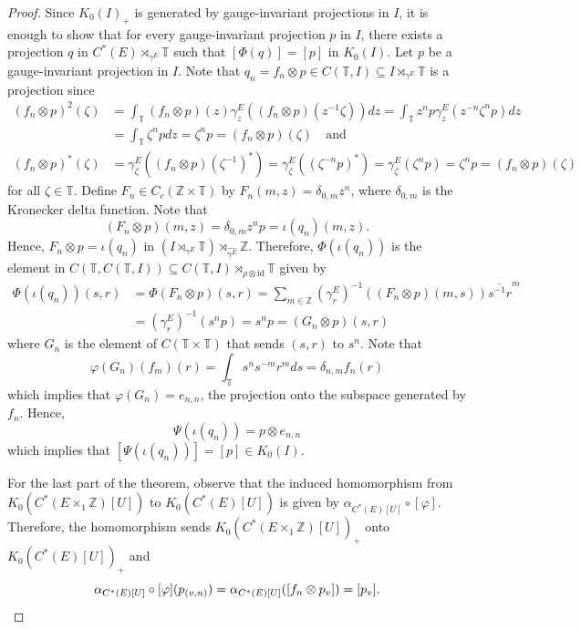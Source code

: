 \documentclass[12pt]{amsbook}%
\renewcommand{\phi}{\varphi}
\theoremstyle{defin}
\theoremstyle{remark}
\numberwithin{equation}{chapter}
\numberwithin{theor}{section}
\newcommand{\ZZ}{\mathbb{Z}}
\begin{document}
\begin{proof}
Since $K_0 (I)_+$ is generated by gauge-invariant projections in $I$, it is enough to show that for every gauge-invariant projection $p$ in $I$, there exists a projection $q$ in $C^*(E) \rtimes_{\gamma^E} \mathbb{T}$ such that $[ \Phi (q) ] = [p]$ in $K_0(I)$.  Let $p$ be a gauge-invariant projection in $I$.  Note that $q_n= f_n \otimes p \in C ( \mathbb{T} , I ) \subseteq I \rtimes_{\gamma^E} \mathbb{T}$ is a projection since
\begin{align*}
( f_n \otimes p )^2 (\zeta ) &= \int_\mathbb{T} ( f_n \otimes p )(z) \gamma_z^E ( ( f_n \otimes p)(z^{-1} \zeta) )dz = \int_\mathbb{T} z^n p \gamma_z^E ( z^{-n} \zeta^n p ) dz \\
				&= \int_\mathbb{T}  \zeta^n p dz = \zeta^n p = ( f_n \otimes p )(\zeta) \quad  \text{and} \\
(f_n \otimes p)^*(\zeta) &= \gamma_\zeta^E ( (f_n \otimes p)(\zeta^{-1})^* ) = \gamma_\zeta^E ( ( \zeta^{-n} p)^*) =\gamma_\zeta^E ( \zeta^n p)= \zeta^n p = (f_n \otimes p)(\zeta)
\end{align*}
for all $\zeta \in \mathbb{T}$.  Define $F_n \in C_c ( \ZZ \times \mathbb{T} )$ by $F_n ( m , z ) = \delta_{0, m} z^n$, where $\delta_{0,m}$ is the Kronecker delta function.  Note that 
\[
(F_n \otimes p)(m, z ) = \delta_{0,m} z^n p = \iota(q_n)(m,z).
\]
Hence, $F_n \otimes p = \iota (q_n)$ in $(I \rtimes_{\gamma^E} \mathbb{T} ) \rtimes_{ \widehat{\gamma^E}} \mathbb{Z}$.  Therefore, $\Phi ( \iota ( q_n ) )$ is the element in $C ( \mathbb{T} , C ( \mathbb{T} , I)) \subseteq C ( \mathbb{T} , I ) \rtimes_{ \rho \otimes \mathrm{id} } \mathbb{T}$ given by 
\begin{align*}
\Phi ( \iota ( q_n ) ) (s,r) &=  \Phi (F_n \otimes p )(s,r) = \sum_{ m \in \ZZ } (\gamma_{r}^E)^{-1} ( (F_n\otimes p )( m, s ) )\overline{ s^{-1} r }^m \\
				&= (\gamma_r^E)^{-1} ( s^n p  ) =  s^n p = (G_n \otimes p)(s,r )
\end{align*}
where $G_n$ is the element of $C ( \mathbb{T} \times \mathbb{T} )$ that sends $(s,r)$ to $s^n$.  Note that 
\[
\phi (G_n )(f_m)(r) = \int_\mathbb{T} s^n  s^{-m} r^m ds = \delta_{n, m} f_n (r)
\]  
which implies that $\phi( G_n) = e_{n,n}$, the projection onto the subspace generated by $f_n$.  Hence, 
\[
\Psi ( \iota ( q_{n} ) ) = p \otimes e_{n,n}
\]
which implies that $[ \Psi ( \iota (q_n) ) ] = [ p ] \in K_0 (I)$.


For the last part of the theorem, observe that the induced homomorphism from $K_0 ( C^*( E \times_1 \ZZ ) [ U ] )$ to $K_0 ( C^*(E)[U])$ is given by $\alpha_{ C^*(E)[U] } \circ [\phi]$.   Therefore, the homomorphism sends $K_0 ( C^*( E \times_1 \ZZ ) [ U ] )_+$ onto $K_0 ( C^*(E)[U])_+$ and 
\[
\alpha_{ C^*(E)[U] } \circ [\phi] ( p_{(v,n) } ) = \alpha_{ C^*(E)[U] }  ( [ f_n \otimes p_v ] ) = [p_v].\qedhere
\]
\end{proof}
\end{document}

